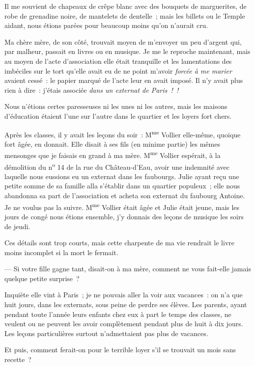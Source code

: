\documentclass[french,twoside]{book} %
\begin{document}
Il me souvient de chapeaux de crêpe blanc avec des bouquets de marguerites, de robe de grenadine noire, de mantelets de dentelle ; mais les billets ou le Temple aidant, nous étions parées pour beaucoup moins qu’on n’aurait cru.\par
Ma chère mère, de son côté, trouvait moyen de m’envoyer un peu d’argent qui, par malheur, passait en livres ou en musique. Je me le reproche maintenant, mais au moyen de l’acte d’association elle était tranquille et les lamentations des imbéciles sur le tort qu’elle avait eu de ne point m’avoir \emph{forcée à me marier} avaient cessé : le papier marqué de l’acte leur en avait imposé. Il n’y avait plus rien à dire : j’étais associée \emph{dans un externat de Paris ! !}\par
Nous n’étions certes paresseuses ni les unes ni les autres, mais les maisons d’éducation étaient l’une sur l’autre dans le quartier et les loyers fort chers.\par
Après les classes, il y avait les leçons du soir : M\textsuperscript{me} Vollier elle-même, quoique fort âgée, en donnait. Elle disait à ses fils (en minime partie) les mêmes mensonges que je faisais en grand à ma mère. M\textsuperscript{me} Vollier espérait, à la démolition du n\textsuperscript{o} 14 de la rue du Château-d’Eau, avoir une indemnité  avec laquelle nous eussions eu un externat dans les faubourgs. Julie ayant reçu une petite somme de sa famille alla s’établir dans un quartier populeux ; elle nous abandonna sa part de l’association et acheta son externat du faubourg Antoine. Je ne voulus pas la suivre. M\textsuperscript{me} Vollier était âgée et Julie était jeune, mais les jours de congé nous étions ensemble, j’y donnais des leçons de musique les soirs de jeudi.\par
Ces détails sont trop courts, mais cette charpente de ma vie rendrait le livre moins incomplet si la mort le fermait.\par
— Si votre fille gagne tant, disait-on à ma mère, comment ne vous fait-elle jamais quelque petite surprise ?\par
Inquiète elle vint à Paris ; je ne pouvais aller la voir aux vacances : on n’a que huit jours, dans les externats, sous peine de perdre ses élèves. Les parents, ayant pendant toute l’année leurs enfants chez eux à part le temps des classes, ne veulent ou ne peuvent les avoir complètement pendant plus de huit à dix jours. Les leçons particulières surtout n’admettaient pas plus de vacances.\par
Et puis, comment ferait-on pour le terrible loyer s’il se trouvait un mois sans recette ?\par
\end{document}
